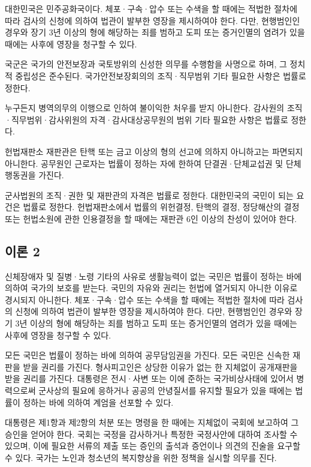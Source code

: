 \documentclass{thesis-SJ}
\begin{document}
	대한민국은 민주공화국이다. 체포·구속·압수 또는 수색을 할 때에는 적법한 절차에 따라 검사의 신청에 의하여 법관이 발부한 영장을 제시하여야 한다. 다만, 현행범인인 경우와 장기 3년 이상의 형에 해당하는 죄를 범하고 도피 또는 증거인멸의 염려가 있을 때에는 사후에 영장을 청구할 수 있다.
	
	국군은 국가의 안전보장과 국토방위의 신성한 의무를 수행함을 사명으로 하며, 그 정치적 중립성은 준수된다. 국가안전보장회의의 조직·직무범위 기타 필요한 사항은 법률로 정한다.
	
	누구든지 병역의무의 이행으로 인하여 불이익한 처우를 받지 아니한다. 감사원의 조직·직무범위·감사위원의 자격·감사대상공무원의 범위 기타 필요한 사항은 법률로 정한다.
	
	헌법재판소 재판관은 탄핵 또는 금고 이상의 형의 선고에 의하지 아니하고는 파면되지 아니한다. 공무원인 근로자는 법률이 정하는 자에 한하여 단결권·단체교섭권 및 단체행동권을 가진다.
	
	군사법원의 조직·권한 및 재판관의 자격은 법률로 정한다. 대한민국의 국민이 되는 요건은 법률로 정한다. 헌법재판소에서 법률의 위헌결정, 탄핵의 결정, 정당해산의 결정 또는 헌법소원에 관한 인용결정을 할 때에는 재판관 6인 이상의 찬성이 있어야 한다.
	
	\subsection{이론 2}
	신체장애자 및 질병·노령 기타의 사유로 생활능력이 없는 국민은 법률이 정하는 바에 의하여 국가의 보호를 받는다. 국민의 자유와 권리는 헌법에 열거되지 아니한 이유로 경시되지 아니한다. 체포·구속·압수 또는 수색을 할 때에는 적법한 절차에 따라 검사의 신청에 의하여 법관이 발부한 영장을 제시하여야 한다. 다만, 현행범인인 경우와 장기 3년 이상의 형에 해당하는 죄를 범하고 도피 또는 증거인멸의 염려가 있을 때에는 사후에 영장을 청구할 수 있다.
	
	모든 국민은 법률이 정하는 바에 의하여 공무담임권을 가진다. 모든 국민은 신속한 재판을 받을 권리를 가진다. 형사피고인은 상당한 이유가 없는 한 지체없이 공개재판을 받을 권리를 가진다. 대통령은 전시·사변 또는 이에 준하는 국가비상사태에 있어서 병력으로써 군사상의 필요에 응하거나 공공의 안녕질서를 유지할 필요가 있을 때에는 법률이 정하는 바에 의하여 계엄을 선포할 수 있다.
	
	대통령은 제1항과 제2항의 처분 또는 명령을 한 때에는 지체없이 국회에 보고하여 그 승인을 얻어야 한다. 국회는 국정을 감사하거나 특정한 국정사안에 대하여 조사할 수 있으며, 이에 필요한 서류의 제출 또는 증인의 출석과 증언이나 의견의 진술을 요구할 수 있다. 국가는 노인과 청소년의 복지향상을 위한 정책을 실시할 의무를 진다.
	
\end{document}
